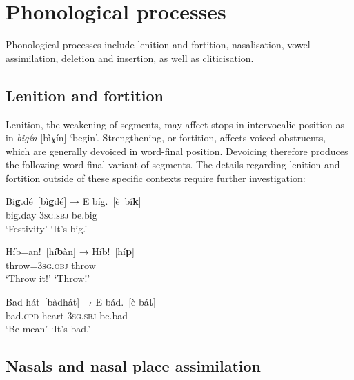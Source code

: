 \section{Phonological processes}\label{sec:2.5}

Phonological processes include lenition and fortition, nasalisation, vowel assimilation, deletion and insertion, as well as cliticisation.

\subsection{Lenition and fortition}\label{sec:2.5.1}

Lenition, the weakening of segments, may affect stops in intervocalic position as in \textit{bigín} [bìɣín] ‘begin’. Strengthening, or fortition, affects voiced obstruents, which are generally devoiced in word-final position. Devoicing therefore produces the following word-final variant of segments. The details regarding lenition and fortition outside of these specific contexts require further investigation:


\begin{exe}\ex
    \label{ex:key:24}
    \glll   Bi\textbf{g}.dé~\textup{[bì\textbf{g}dé]}      →    E    bíg.~\textup{[è~bí\textbf{k}]}\\
big.day   {}  \textsc{3sg.sbj}  be.big\\
‘Festivity’  {}  {‘It’s big.’}  \\
\glt
\end{exe}


\begin{exe}\ex
    \label{ex:key:25}
    \glll   Híb=an!~\textup{[hí\textbf{b}àn]}      →    Híb!~\textup{[hí\textbf{p}]}\\
throw=\textsc{3sg.obj}  {}  throw\\
{‘Throw it!’}  {}  ‘Throw!’  \\
\end{exe}

\begin{exe}\ex
    \label{ex:key:26}
    \glll   Bad-hát~\textup{[bàdhát]}      →    E    bád.~\textup{[è  bá\textbf{t}]}\\
bad.\textsc{cpd}{}-heart     {}       \textsc{3sg.sbj}  be.bad\\
{‘Be mean’}  {}  {‘It’s bad.’}  \\
\end{exe}

\subsection{Nasals and nasal place assimilation}\label{sec:2.5.2}


